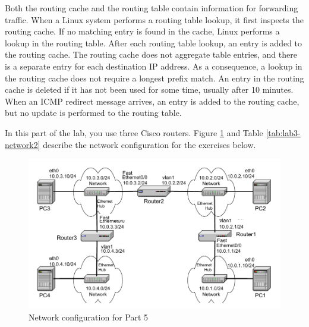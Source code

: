 Both the routing cache and the routing table contain information for forwarding traffic. When a Linux system performs a routing table lookup, it first inspects the routing cache. If no matching entry is found in the cache, Linux performs a lookup in the routing table. After each routing table lookup, an entry is added to the routing cache. The routing cache does not aggregate table entries, and there is a separate entry for each destination IP address. As a consequence, a lookup in the routing cache does not require a longest prefix match. An entry in the routing cache is deleted if it has not been used for some time, usually after 10 minutes. When an ICMP redirect message arrives, an entry is added to the routing cache, but no update is performed to the routing table.


In this part of the lab, you use three Cisco routers. Figure \ref{fig:lab3-network2} and Table \ref{tab:lab3-network2} describe the network configuration for the exercises below.

\begin{figure}[h!t]
	\centering
	\includegraphics[width=\linewidth]{graphics/lab3-network2-updated.pdf}	
	\caption{Network configuration for Part 5}
	\label{fig:lab3-network2}
\end{figure}

